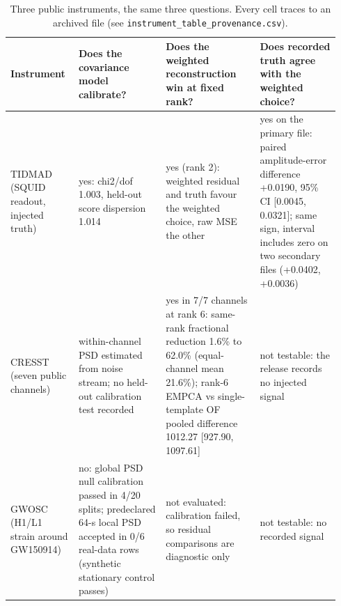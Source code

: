 \begin{table}[!htbp]
\centering
\footnotesize
\caption{Three public instruments, the same three questions.  Every cell traces to an archived file (see \texttt{instrument\_table\_provenance.csv}).}
\label{tab:instruments}
\begin{tabular}{p{0.19\linewidth}p{0.25\linewidth}p{0.27\linewidth}p{0.23\linewidth}}
\toprule
Instrument & Does the covariance model calibrate? & Does the weighted reconstruction win at fixed rank? & Does recorded truth agree with the weighted choice? \\
\midrule
TIDMAD (SQUID readout, injected truth) & yes: chi2/dof 1.003, held-out score dispersion 1.014 & yes (rank 2): weighted residual and truth favour the weighted choice, raw MSE the other & yes on the primary file: paired amplitude-error difference +0.0190, 95\% CI [0.0045, 0.0321]; same sign, interval includes zero on two secondary files (+0.0402, +0.0036) \\
CRESST (seven public channels) & within-channel PSD estimated from noise stream; no held-out calibration test recorded & yes in 7/7 channels at rank 6: same-rank fractional reduction 1.6\% to 62.0\% (equal-channel mean 21.6\%); rank-6 EMPCA vs single-template OF pooled difference 1012.27 [927.90, 1097.61] & not testable: the release records no injected signal \\
GWOSC (H1/L1 strain around GW150914) & no: global PSD null calibration passed in 4/20 splits; predeclared 64-s local PSD accepted in 0/6 real-data rows (synthetic stationary control passes) & not evaluated: calibration failed, so residual comparisons are diagnostic only & not testable: no recorded signal \\
\bottomrule
\end{tabular}
\end{table}
